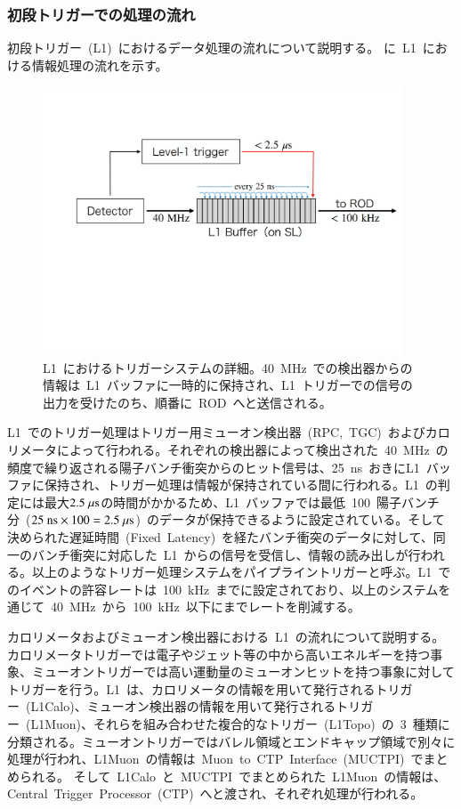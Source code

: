 \subsubsection{初段トリガーでの処理の流れ}
初段トリガー~(L1)~におけるデータ処理の流れについて説明する。
に~L1~における情報処理の流れを示す。
\begin{figure}[H]
        \centering   
        \includegraphics[width=0.95\textwidth,page=1]{img/pdf/pipe.pdf}
        \caption[L1~におけるトリガーシステムの詳細]{L1~におけるトリガーシステムの詳細。40~MHz~での検出器からの情報は~L1~バッファに一時的に保持され、L1~トリガーでの信号の出力を受けたのち、順番に~ROD~へと送信される。}\label{fig:pipe}
\end{figure}
L1~でのトリガー処理はトリガー用ミューオン検出器~(RPC,~TGC)~およびカロリメータによって行われる。それぞれの検出器によって検出された~40~MHz~の頻度で繰り返される陽子バンチ衝突からのヒット信号は、25~ns~おきにL1~バッファに保持され、トリガー処理は情報が保持されている間に行われる。L1~の判定には最大$2.5~\mu\rm{s}$の時間がかかるため、L1~バッファでは最低~100~陽子バンチ分~($25~\rm{ns}\times100=2.5~\mu\rm{s}$)~のデータが保持できるように設定されている。そして決められた遅延時間~(Fixed~Latency)~を経たバンチ衝突のデータに対して、同一のバンチ衝突に対応した~L1~からの信号を受信し、情報の読み出しが行われる。以上のようなトリガー処理システムをパイプライントリガーと呼ぶ。L1~でのイベントの許容レートは~100~kHz~までに設定されており、以上のシステムを通じて~40~MHz~から~100~kHz~以下にまでレートを削減する。

カロリメータおよびミューオン検出器における~L1~の流れについて説明する。カロリメータトリガーでは電子やジェット等の中から高いエネルギーを持つ事象、ミューオントリガーでは高い運動量のミューオンヒットを持つ事象に対してトリガーを行う。L1~は、カロリメータの情報を用いて発行されるトリガー~(L1Calo)、ミューオン検出器の情報を用いて発行されるトリガー~(L1Muon)、それらを組み合わせた複合的なトリガー~(L1Topo)~の~3~種類に分類される。ミューオントリガーではバレル領域とエンドキャップ領域で別々に処理が行われ、L1Muon~の情報は~Muon~to~CTP~Interface~(MUCTPI)~でまとめられる。
そして~L1Calo~と~MUCTPI~でまとめられた~L1Muon~の情報は、Central~Trigger~Processor~(CTP)~へと渡され、それぞれ処理が行われる。

